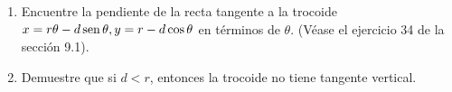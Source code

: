 \item 
    \begin{enumerate}
        \item[(a)] Encuentre la pendiente de la recta tangente a la trocoide $x = r\theta - d\operatorname{sen}\theta, y = r - d\cos\theta$ en términos de $\theta$. (Véase el ejercicio 34 de la sección 9.1).
        \item[(b)] Demuestre que si $d < r$, entonces la trocoide no tiene tangente vertical.
    \end{enumerate}
